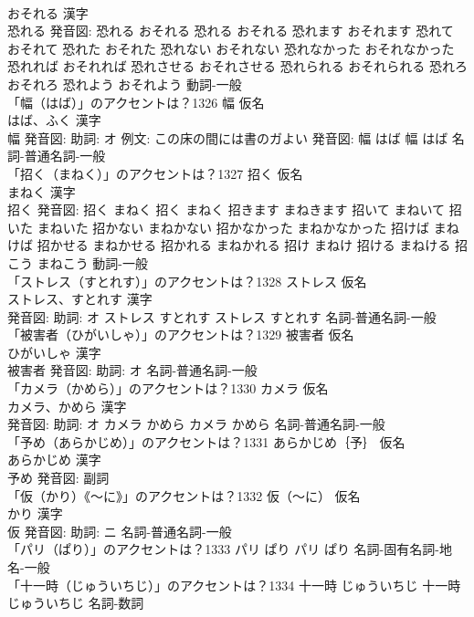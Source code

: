 \documentclass[8pt]{extreport}
\begin{document}
\begin{CJK}{UTF8}{min}
\\	おそれる 漢字　
\\	恐れる 発音図:	恐れる おそれる		恐れる おそれる 恐れます おそれます 恐れて おそれて 恐れた おそれた 恐れない おそれない 恐れなかった おそれなかった 恐れれば おそれれば 恐れさせる おそれさせる 恐れられる おそれられる 恐れろ おそれろ 恐れよう おそれよう				動詞-一般 
\\	「幅（はば）」のアクセントは？1326	幅 仮名　
\\	はば、ふく 漢字　
\\	幅 発音図: 助詞: オ 例文: この床の間には書のガよい 発音図:	幅 はば		幅 はば				名詞-普通名詞-一般 
\\	「招く（まねく）」のアクセントは？1327	招く 仮名　
\\	まねく 漢字　
\\	招く 発音図:	招く まねく		招く まねく 招きます まねきます 招いて まねいて 招いた まねいた 招かない まねかない 招かなかった まねかなかった 招けば まねけば 招かせる まねかせる 招かれる まねかれる 招け まねけ 招ける まねける 招こう まねこう				動詞-一般 
\\	「ストレス（すとれす）」のアクセントは？1328	ストレス 仮名　
\\	ストレス、すとれす 漢字　
\\	発音図: 助詞: オ	ストレス すとれす		ストレス すとれす				名詞-普通名詞-一般 
\\	「被害者（ひがいしゃ）」のアクセントは？1329	被害者 仮名　
\\	ひがいしゃ 漢字　
\\	被害者 発音図: 助詞: オ							名詞-普通名詞-一般 
\\	「カメラ（かめら）」のアクセントは？1330	カメラ 仮名　
\\	カメラ、かめら 漢字　
\\	発音図: 助詞: オ	カメラ かめら		カメラ かめら				名詞-普通名詞-一般 
\\	「予め（あらかじめ）」のアクセントは？1331	あらかじめ｛予｝ 仮名　
\\	あらかじめ 漢字　
\\	予め 発音図:							副詞 
\\	「仮（かり）《〜に》」のアクセントは？1332	仮（〜に） 仮名　
\\	かり 漢字　
\\	仮 発音図: 助詞: ニ							名詞-普通名詞-一般 
\\	「パリ（ぱり）」のアクセントは？1333		パリ ぱり		パリ ぱり				名詞-固有名詞-地名-一般 
\\	「十一時（じゅういちじ）」のアクセントは？1334		十一時 じゅういちじ		十一時 じゅういちじ				名詞-数詞 

\end{CJK}
\end{document}
